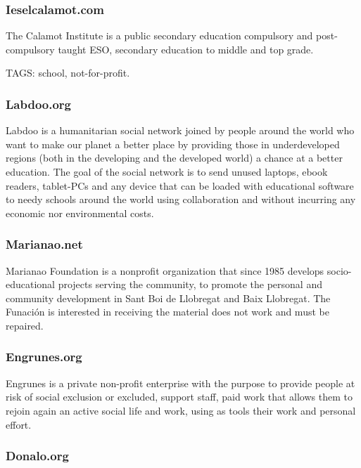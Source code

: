 \documentclass[
]{book}
\begin{document}
\hypertarget{ieselcalamot.com}{%
\subsubsection{Ieselcalamot.com}\label{ieselcalamot.com}}

The Calamot Institute is a public secondary education compulsory and post-compulsory taught ESO, secondary education to middle and top grade.

TAGS: school, not-for-profit.

\hypertarget{labdoo.org}{%
\subsubsection{Labdoo.org}\label{labdoo.org}}

Labdoo is a humanitarian social network joined by people around the world who want to make our planet a better place by providing those in underdeveloped regions (both in the developing and the developed world) a chance at a better education. The goal of the social network is to send unused laptops, ebook readers, tablet-PCs and any device that can be loaded with educational software to needy schools around the world using collaboration and without incurring any economic nor environmental costs.

\hypertarget{marianao.net}{%
\subsubsection{Marianao.net}\label{marianao.net}}

Marianao Foundation is a nonprofit organization that since 1985 develops socio-educational projects serving the community, to promote the personal and community development in Sant Boi de Llobregat and Baix Llobregat. The Funación is interested in receiving the material does not work and must be repaired.

\hypertarget{engrunes.org}{%
\subsubsection{Engrunes.org}\label{engrunes.org}}

Engrunes is a private non-profit enterprise with the purpose to provide people at risk of social exclusion or excluded, support staff, paid work that allows them to rejoin again an active social life and work, using as tools their work and personal effort.

\hypertarget{donalo.org}{%
\subsubsection{Donalo.org}\label{donalo.org}}
\end{document}
